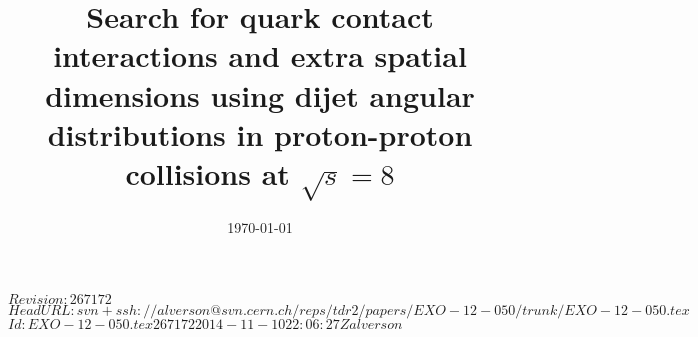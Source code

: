\documentclass[11pt,twoside,a4paper,cmspaper,final,collab]{cms-tdr}
\begin{document}


\RCS$Revision: 267172 $
\RCS$HeadURL: svn+ssh://alverson@svn.cern.ch/reps/tdr2/papers/EXO-12-050/trunk/EXO-12-050.tex $
\RCS$Id: EXO-12-050.tex 267172 2014-11-10 22:06:27Z alverson $
\newlength\cmsFigWidth
{}

\providecommand{\nED}{\ensuremath{n_\mathrm{ED}}\xspace}
\providecommand{\CIJET} {{\textsc{cijet}}\xspace}
\providecommand{\CIDIJET} {{\textsc{cidijet}}\xspace}
\providecommand{\NLOJETPP} {{\textsc{NLOJet++}}\xspace}
\providecommand{\fastNLO} {{\textsc{fastNLO}}\xspace}
\providecommand{\fastjet} {{\textsc{FastJet}}\xspace}
\providecommand{\GeVsq}{\ensuremath{\GeV^2}\xspace}
\providecommand{\PYTHIAS} {{\textsc{pythia 6}}\xspace}
\providecommand{\PYTHIAE} {{\textsc{pythia 8}}\xspace}
\providecommand{\RooUnfold} {{\textsc{RooUnfold}}\xspace}
\providecommand{\ptmax}{\ensuremath{p_{\mathrm{T,max}}}\xspace}
\providecommand{\mur}{\ensuremath{\mu_R}\xspace}
\providecommand{\muf}{\ensuremath{\mu_F}\xspace}
\providecommand{\rbthm}{\rule[-2ex]{0ex}{5ex}}
\providecommand{\rbtrr}{\rule[-0.8ex]{0ex}{3.2ex}}
\providecommand{\chijj}{\ensuremath{\chi_\text{dijet}}\xspace}
\providecommand{\ystar}{\ensuremath{y^{\star}}\xspace}
\providecommand{\yboost}{\ensuremath{y_\text{boost}}\xspace}
\providecommand{\intlumi} {19.7\fbinv\xspace}
\providecommand{\mjj} {\ensuremath{M_{jj}}\xspace}
\providecommand{\avept}{\ensuremath{\langle p_\mathrm{T1,2}\rangle}\xspace}

\title{Search for quark contact interactions and extra spatial
dimensions using dijet angular distributions in proton-proton
collisions at $\sqrt{s} = 8$\TeV}












\date{\today}
\end{document}
